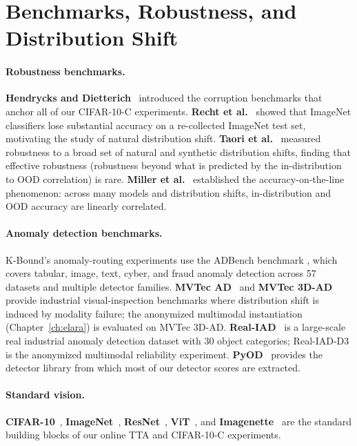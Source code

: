 \section{Benchmarks, Robustness, and Distribution Shift}\label{sec:rel-bench}

\paragraph{Robustness benchmarks.}
\textbf{Hendrycks and Dietterich}~\cite{hendrycks2019benchmarking} introduced
the corruption benchmarks that anchor all of our CIFAR-10-C experiments.
\textbf{Recht et al.}~\cite{recht2019imagenet} showed that ImageNet classifiers
lose substantial accuracy on a re-collected ImageNet test set, motivating the
study of natural distribution shift.
\textbf{Taori et al.}~\cite{taori2020measuring} measured robustness to a broad
set of natural and synthetic distribution shifts, finding that effective
robustness (robustness beyond what is predicted by the in-distribution to
OOD correlation) is rare.
\textbf{Miller et al.}~\cite{miller2021accuracy} established the accuracy-on-the-line
phenomenon: across many models and distribution shifts, in-distribution and
OOD accuracy are linearly correlated.

\paragraph{Anomaly detection benchmarks.}
K-Bound's anomaly-routing experiments use the ADBench benchmark
\cite{han2022adbench}, which covers tabular, image, text, cyber, and fraud
anomaly detection across 57 datasets and multiple detector families.
\textbf{MVTec AD}~\cite{bergmann2019mvtec} and
\textbf{MVTec 3D-AD}~\cite{bergmann2022mvtec3d} provide industrial
visual-inspection benchmarks where distribution shift is induced by modality
failure; the anonymized multimodal instantiation (Chapter~\ref{ch:elara}) is evaluated
on MVTec 3D-AD.
\textbf{Real-IAD}~\cite{wang2024realiad} is a large-scale real industrial
anomaly detection dataset with 30 object categories; Real-IAD-D3 is the
anonymized multimodal reliability experiment.
\textbf{PyOD}~\cite{zhao2019pyod} provides the detector library from which
most of our detector scores are extracted.

\paragraph{Standard vision.}
\textbf{CIFAR-10}~\cite{krizhevsky2009cifar}, \textbf{ImageNet}~\cite{deng2009imagenet},
\textbf{ResNet}~\cite{he2016resnet}, \textbf{ViT}~\cite{dosovitskiy2021vit},
and \textbf{Imagenette}~\cite{howard2019imagenette} are the standard
building blocks of our online TTA and CIFAR-10-C experiments.

